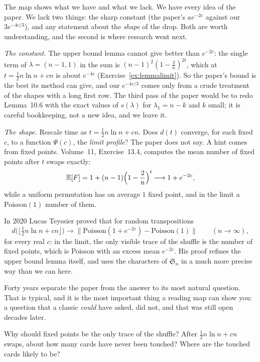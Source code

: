 The map shows what we have and what we lack. We have every idea of the paper. We lack two things: the sharp constant (the paper's $ae^{-2c}$
against our $3e^{-4c/3}$), and any statement about the \emph{shape} of the drop. Both are worth understanding, and the second is where research went
next.

\emph{The constant.} The upper bound lemma cannot give better than $e^{-2c}$: the single term of $\lambda=(n-1,1)$ in the sum is
$(n-1)^2(1-\frac2n)^{2t}$, which at $t=\frac12n\ln n+cn$ is about $e^{-4c}$ (Exercise~\ref{ex:lemmalimit}). So the paper's bound is the best its method can give,
and our $e^{-4c/3}$ comes only from a crude treatment of the shapes with a long first row. The third pass of the paper would be to redo
Lemma~10.6 with the exact values of $s(\lambda)$ for $\lambda_1=n-k$ and $k$ small; it is careful bookkeeping, not a new idea, and we leave it.

\emph{The shape.} Rescale time as $t=\frac12n\ln n+cn$. Does $d(t)$ converge, for each fixed $c$, to a function $\Psi(c)$, the \emph{limit profile}? The
paper does not say. A hint comes from fixed points. Volume~11, Exercise~13.4, computes the mean number of fixed points after $t$ swaps exactly:
\[
\mathbb E[F]=1+(n-1)\Bigl(1-\frac2n\Bigr)^t\longrightarrow1+e^{-2c},
\]
while a uniform permutation has on average $1$ fixed point, and in the limit a Poisson$(1)$ number of them.

\begin{remark}\label{rem:teyssier}
In 2020 Lucas Teyssier proved that for random transpositions
\[
d\bigl(\lfloor\tfrac12n\ln n+cn\rfloor\bigr)\longrightarrow\bigl\|\mathrm{Poisson}(1+e^{-2c})-\mathrm{Poisson}(1)\bigr\|\qquad(n\to\infty),
\]
for every real $c$: in the limit, the only visible trace of the shuffle is the number of fixed points, which is Poisson with an excess mean $e^{-2c}$. His proof
refines the upper bound lemma itself, and uses the characters of $\mathfrak S_n$ in a much more precise way than we can here.
\end{remark}

Forty years separate the paper from the answer to its most natural question. That is typical, and it is the most important thing a reading map
can show you: a question that a classic \emph{could} have asked, did not, and that was still open decades later.

\begin{think}
Why should fixed points be the only trace of the shuffle? After $\frac12n\ln n+cn$ swaps, about how many cards have never been touched? Where are
the touched cards likely to be?
\end{think}

